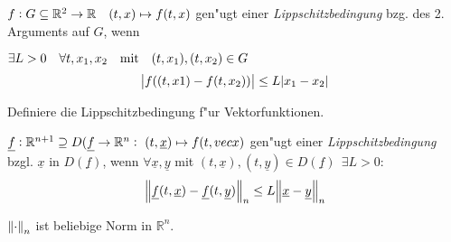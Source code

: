 \documentclass[9pt]{article}
\newcommand{\Rn}{\mathbb{R}^n}
\newcommand{\R}[1]{%
	\ifthenelse{\equal{#1}{}}
		{\mathbb{R}}
		{\mathbb{R}^{#1}}}%
\renewcommand{\vec}[1]{\underline{#1}}
\newenvironment{field}{}{\newpage}
\newif\ifnote
\newenvironment{note}{\notetrue}{\notefalse}
\newcommand{\localtag}{}
\newcommand{\globaltag}{}
\newcommand{\uuid}{}
\newcommand{\tags}[1]{
    \ifnote 
        \renewcommand{\localtag}{#1}
    \else
        \renewcommand{\globaltag}{#1}
    \fi 
    }
\newcommand{\xplain}[1]{\renewcommand{\uuid}{#1}}
\begin{document}
\begin{note}
	\xplain{UUID}  %
	\tags{definition, Lippschitz, 3.4.1, 3.4.8}
	
	\begin{field}  %
		 $f:G\subseteq \R{2} \rightarrow \R{} \quad (t,x) \mapsto f(t,x)$ gen"ugt einer
		 \textit{Lippschitzbedingung} bzg. des 2. Arguments auf $G$, wenn
	\end{field}  
	
	\begin{field}  %
		$\exists L>0 \quad \forall t, x_1, x_2 \qq{mit} (t,x_1), (t,x_2) \in G$
		\begin{equation*}
			 \abs{f((t,x1) - f(t,x_2))} \leq L\abs{x_1 -x_2}
		\end{equation*}
	\end{field}
		
	\begin{field}  %
		Definiere die Lippschitzbedingung f"ur Vektorfunktionen.
	\end{field}
	
	\begin{field}  %
		$\vec{f}: \R{n+1} \supseteq D(\vec{f} \rightarrow \R{n} :\  (t,\vec{x}) \mapsto f(t, vec{x})$
		gen"ugt einer \textit{Lippschitzbedingung} bzgl. $\vec{x}$ in $D(\vec{f})$, wenn
		$\forall \vec{x}, \vec{y}$ mit $(t,\vec{x}), (t,\vec{y}) \in D(\vec{f})  \ \ \exists L >0$:
		\begin{equation*}
			\norm{\vec{f}(t,\vec{x}) - \vec{f}(t, \vec{y})}_n \leq L \norm{\vec{x} - \vec{y}}_n
		\end{equation*}
		
		$\norm{\cdot}_n$ ist beliebige Norm in $\Rn$.
	\end{field}
\end{note}
\end{document}
